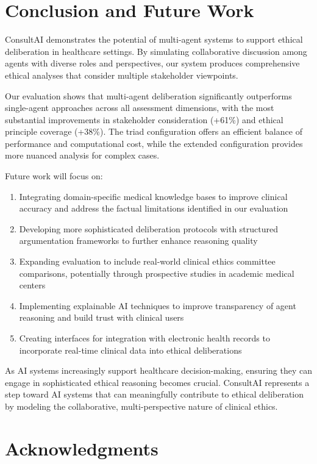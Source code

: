 \documentclass[11pt]{article}
\begin{document}
\section{Conclusion and Future Work}

ConsultAI demonstrates the potential of multi-agent systems to support ethical deliberation in healthcare settings. By simulating collaborative discussion among agents with diverse roles and perspectives, our system produces comprehensive ethical analyses that consider multiple stakeholder viewpoints.

Our evaluation shows that multi-agent deliberation significantly outperforms single-agent approaches across all assessment dimensions, with the most substantial improvements in stakeholder consideration (+61\%) and ethical principle coverage (+38\%). The triad configuration offers an efficient balance of performance and computational cost, while the extended configuration provides more nuanced analysis for complex cases.

Future work will focus on:
\begin{enumerate}
    \item Integrating domain-specific medical knowledge bases to improve clinical accuracy and address the factual limitations identified in our evaluation
    \item Developing more sophisticated deliberation protocols with structured argumentation frameworks to further enhance reasoning quality
    \item Expanding evaluation to include real-world clinical ethics committee comparisons, potentially through prospective studies in academic medical centers
    \item Implementing explainable AI techniques to improve transparency of agent reasoning and build trust with clinical users
    \item Creating interfaces for integration with electronic health records to incorporate real-time clinical data into ethical deliberations
\end{enumerate}

As AI systems increasingly support healthcare decision-making, ensuring they can engage in sophisticated ethical reasoning becomes crucial. ConsultAI represents a step toward AI systems that can meaningfully contribute to ethical deliberation by modeling the collaborative, multi-perspective nature of clinical ethics.

\section*{Acknowledgments}
\end{document}
